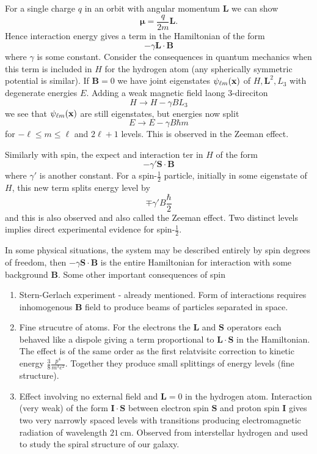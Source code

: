 \documentclass{article}
\begin{document}
\begin{example}
  For a single charge $ q $ in an orbit with angular momentum $ \mathbf L $ we can show 
  \[
	  \boldsymbol \mu = \frac q{2m} \mathbf L.
  \]
  Hence interaction energy gives a term in the Hamiltonian of the form
  \[
    -\gamma\mathbf L\cdot \mathbf B
  \]
  where $ \gamma $ is some constant. Consider the consequences in quantum mechanics when this term is included in $ H $ for the hydrogen atom (any spherically symmetric potential is similar). If $ \mathbf B = 0 $ we have joint eigenstates $ \psi_{\ell m}(\mathbf{x}) $ of $ H,\mathbf L^2, L_3 $ with degenerate energies $ E $. Adding a weak magnetic field laong $ 3 $-direciton
  \[
    H \to H -\gamma BL_3
  \]
  we see that $ \psi_{\ell m}(\mathbf{x}) $ are still eigenstates, but energies now split 
  \[
    E \to E - \gamma B\hbar m
  \]
  for $ -\ell \le m \le \ell $ and $ 2\ell + 1$ levels. This is observed in the Zeeman effect. \par
  Similarly with spin, the expect and interaction ter in $ H $ of the form
  \[
    -\gamma' \mathbf S \cdot\mathbf B
  \]
  where $ \gamma' $ is another constant. For a spin-$ \frac 12 $ particle, initially in some eigenstate of $ H $, this new term splits energy level by
  \[
    \mp \gamma' B\frac \hbar 2
  \]
  and this is also observed and also called the Zeeman effect. Two distinct levels implies direct experimental evidence for spin-$ \frac 12 $.
\end{example}
In some physical situations, the system may be described entirely by spin degrees of freedom, then $ -\gamma \mathbf S \cdot\mathbf B $ is the entire Hamiltonian for interaction with some background $ \mathbf B $. Some other important consequences of spin
\begin{enumerate}
	\item Stern-Gerlach experiment - already mentioned. Form of interactions requires inhomogenous $ \mathbf B $ field to produce beams of particles separated in space.
	\item Fine strucutre of atoms. For the electrons the $ \mathbf L $ and $ \mathbf S $ operators each behaved like a dispole giving a term proportional to $ \mathbf L \cdot\mathbf S $ in the Hamiltonian. The effect is of the same order as the first relatvisitc correction to kinetic energy $ \frac 38 \frac{p^4}{m^3 e^2} $. Together they produce small splittings of energy levels (fine structure).
	\item Effect involving no external field and $ \mathbf L = 0 $ in the hydrogen atom. Interaction (very weak) of the form $ \mathbf I \cdot \mathbf S $ between electron spin $ \mathbf S $ and proton spin $ \mathbf I $ gives two very narrowly spaced levels with transitions producing electromagnetic radiation of wavelength $ 21 \ \mathrm{cm} $. Observed from interstellar hydrogen and used to study the spiral structure of our galaxy.
\end{enumerate}
\end{document}
